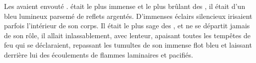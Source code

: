 Les \Dormus avaient envouté \Mey. \Boromu était le plus immense et le plus brûlant des \SerpentsCosmiques, il était d'un bleu lumineux parsemé de reflets argentés. D'immenses éclairs silencieux irisaient parfois l'intérieur de son corps. Il était le plus sage des \Dormus, et ne se départit jamais de son rôle, il allait inlassablement, avec lenteur, apaisant toutes les tempêtes de feu qui se déclaraient, repassant les tumultes de son immense flot bleu et laissant derrière lui des écoulements de flammes laminaires et pacifiés.
